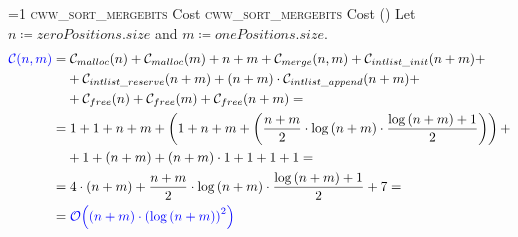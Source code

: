 \setcounter{cwwsortmergebitscostcounter}{1}
\newcommand{\cwwsortmergebitscostframe}{%
    \ifnum\value{cwwsortmergebitscostcounter}=1
        \textsc{cww\_sort\_mergebits} Cost%
    \else
        \textsc{cww\_sort\_mergebits} Cost (\thecwwsortmergebitscostcounter)%
    \fi
}
            \begin{frame}{\cwwsortmergebitscostframe}
                Let $n \coloneqq zeroPositions.size$ and $m \coloneqq onePositions.size$.
                \begin{align*}
                    \textcolor{blue}{\mathcal{C}{\left(n, m\right)}} = & \; \mathcal{C}_{malloc}{\left(n\right)} + \mathcal{C}_{malloc}{\left(m\right)} + n + m + \mathcal{C}_{merge}{\left(n, m\right)} + \mathcal{C}_{intlist\_init}{\left(n + m\right)} + \\
                    & + \mathcal{C}_{intlist\_reserve}{\left(n + m\right)} + \left(n + m\right) \cdot \mathcal{C}_{intlist\_append}{\left(n + m\right)} + \\
                    & + \mathcal{C}_{free}{\left(n\right)} + \mathcal{C}_{free}{\left(m\right)} + \mathcal{C}_{free}{\left(n + m\right)} = \\
                    = & \; 1 + 1 + n + m + \left(1 + n + m + \left(\frac{n + m}{2} \cdot \log{\left(n + m\right)} \cdot \frac{\log{\left(n + m\right)} + 1}{2}\right)\right) + \\
                    & + 1 + \left(n + m\right) + \left(n + m\right) \cdot 1 + 1 + 1 + 1 = \\
                    = & \; 4 \cdot \left(n + m\right) + \frac{n + m}{2} \cdot \log{\left(n + m\right)} \cdot \frac{\log{\left(n + m\right)} + 1}{2} + 7 = \\
                    = & \; \textcolor{blue}{\mathcal{O}{\left(\left(n + m\right) \cdot \left(\log{\left(n + m\right)}\right)^2\right)}}
                \end{align*}
            \end{frame}

